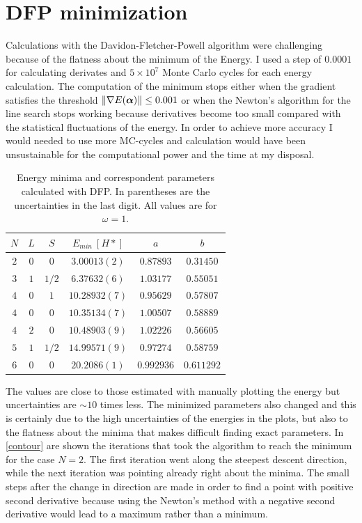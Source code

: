 \section{DFP minimization}
Calculations with the Davidon-Fletcher-Powell algorithm were challenging because of the flatness about the minimum of the Energy.
I used a step of $0.0001$ for calculating derivates and $5\times10^7$ Monte Carlo cycles for each energy calculation.
The computation of the minimum stops either when the gradient satisfies the threshold ${\| \nabla E(\bm{\alpha}) \|}\leq0.001$ or when the Newton's algorithm for the line search stops working because derivatives become too small compared with the statistical fluctuations of the energy.
In order to achieve more accuracy I would needed to use more MC-cycles and calculation would have been unsustainable for the computational power and the time at my disposal.

\begin{table}[H]
  \centering
  \begin{tabular}{c|c|c|c|c|c}
    \toprule
    $N$ & $L$ & $S$ & $E_{min}\>[H*]$ & $a$ & $b$ \\
    \hline
    $2$ & $0$ & $0$ & $3.00013(2)$ & $0.87893$ & $0.31450$ \\
    $3$ & $1$ & $1/2$ & $6.37632(6)$ & $1.03177$ & $0.55051$ \\
    $4$ & $0$ & $1$ & $10.28932(7)$ & $0.95629$ & $0.57807$ \\
    $4$ & $0$ & $0$ & $10.35134(7)$ & $1.00507$ & $0.58889$ \\
    $4$ & $2$ & $0$ & $10.48903(9)$ & $1.02226$ & $0.56605$ \\
    $5$ & $1$ & $1/2$ & $14.99571(9)$ & $0.97274$ & $0.58759$ \\
    $6$ & $0$ & $0$ & $20.2086(1)$ & $0.992936$ & $0.611292$ \\
    \bottomrule
  \end{tabular}
  \caption[Energy minima and correspondent parameters calculated with DFP.]{Energy minima and correspondent parameters calculated with DFP. In parentheses are the uncertainties in the last digit. All values are for $\omega=1$.}
  \label{DFPMinima}
\end{table}

The values are close to those estimated with manually plotting the energy but uncertainties are $\sim 10$ times less.
The minimized parameters also changed and this is certainly due to the high uncertainties of the energies in the plots, but also to the flatness about the minima that makes difficult finding exact parameters.
In \autoref{contour} are shown the iterations that took the algorithm to reach the minimum for the case $N=2$. %
The first iteration went along the steepest descent direction, while the next iteration was pointing already right about the minima.
The small steps after the change in direction are made in order to find a point with positive second derivative because using the Newton's method with a negative second derivative would lead to a maximum rather than a minimum.

